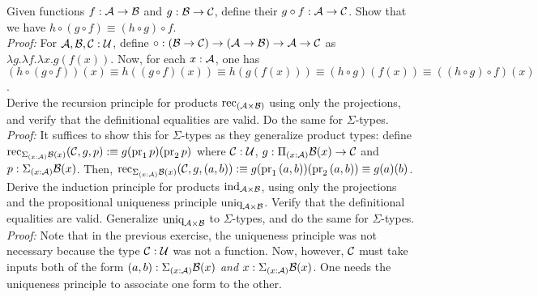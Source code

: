  Given functions $f : \mathcal{A} \to \mathcal{B}$ and $g : \mathcal{B} \to \mathcal{C}$, define their  $g \circ f : \mathcal{A} \to \mathcal{C}$. Show that we have $h \circ (g \circ f) \equiv (h \circ g) \circ f$. \\


\textit{Proof:} For $\mathcal{A},\mathcal{B},\mathcal{C} : \mathcal{U}$, define $\circ : (\mathcal{B} \to \mathcal{C}) \to (\mathcal{A} \to \mathcal{B}) \to \mathcal{A} \to \mathcal{C}$ as $\lambda g . \lambda f . \lambda x . g(f(x))$. Now, for each $x : \mathcal{A}$, one has $(h \circ (g \circ f))(x) \equiv h((g \circ f)(x)) \equiv h(g(f(x))) \equiv (h \circ g)(f(x)) \equiv ((h \circ g) \circ f)(x)$. \\



 Derive the recursion principle for products $\text{rec}_{(\mathcal{A} \times \mathcal{B})}$ using only the projections, and verify that the definitional equalities are valid. Do the same for $\Sigma$-types. \\


\textit{Proof:} It suffices to show this for $\Sigma$-types as they generalize product types: define $\text{rec}_{\Sigma_{(x : \mathcal{A})}\mathcal{B}(x)}(\mathcal{C},g,p) :\equiv g(\text{pr}_1\,p)(\text{pr}_2\,p)$ where $\mathcal{C} : \mathcal{U}$, $g : \Pi_{(x : \mathcal{A})}\mathcal{B}(x) \to \mathcal{C}$ and $p : \Sigma_{(x : \mathcal{A})}\mathcal{B}(x)$. Then, $\text{rec}_{\Sigma_{(x : \mathcal{A})}\mathcal{B}(x)}(\mathcal{C},g,(a,b)) :\equiv g(\text{pr}_1\,(a,b))(\text{pr}_2\,(a,b)) \equiv g(a)(b)$. \\


    
 Derive the induction principle for products $\text{ind}_{\mathcal{A} \times \mathcal{B}}$, using only the projections and the propositional uniqueness principle $\text{uniq}_{\mathcal{A} \times \mathcal{B}}$. Verify that the definitional equalities are valid. Generalize $\text{uniq}_{\mathcal{A} \times \mathcal{B}}$ to $\Sigma$-types, and do the same for $\Sigma$-types. \\


\textit{Proof:} Note that in the previous exercise, the uniqueness principle was not necessary because the type $\mathcal{C} : \mathcal{U}$ was not a function. Now, however, $\mathcal{C}$ must take inputs both of the form $(a,b) : \Sigma_{(x : \mathcal{A})}\mathcal{B}(x)$ \textit{and} $x : \Sigma_{(x : \mathcal{A})}\mathcal{B}(x)$. One needs the uniqueness principle to associate one form to the other.

